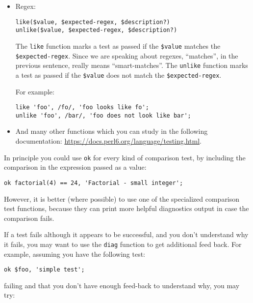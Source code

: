 \begin{itemize}
\item Regex:

\begin{verbatim}
like($value, $expected-regex, $description?)
unlike($value, $expected-regex, $description?)
\end{verbatim}

The {\tt like} function marks a test as passed if the 
\verb'$value' matches the \verb'$expected-regex'. Since 
we are speaking about regexes, ``matches'', in the 
previous sentence, really means ``smart-matches''. The 
{\tt unlike} function marks a test as passed if the 
\verb'$value' does not match the \verb'$expected-regex'.

For example:
\begin{verbatim}
like 'foo', /fo/, 'foo looks like fo';
unlike 'foo', /bar/, 'foo does not look like bar';
\end{verbatim}

\item And many other functions which you can study in the 
following documentation: \url{https://docs.perl6.org/language/testing.html}.

\end{itemize}

In principle you could use {\tt ok} for every kind of 
comparison test, by including the comparison in the 
expression passed as a value:

\begin{verbatim}
ok factorial(4) == 24, 'Factorial - small integer';
\end{verbatim}

However, it is better (where possible) to use one of the 
specialized comparison test functions, because they can 
print more helpful diagnostics output in case the comparison 
fails.

If a test fails although it appears to be successful, and 
you don't understand why it fails, you may want to use the 
\verb'diag' function to get additional feed back. For example,
assuming you have the following test:

\begin{verbatim}
ok $foo, 'simple test';
\end{verbatim} 

failing and that you don't have enough feed-back to 
understand why, you may try:


